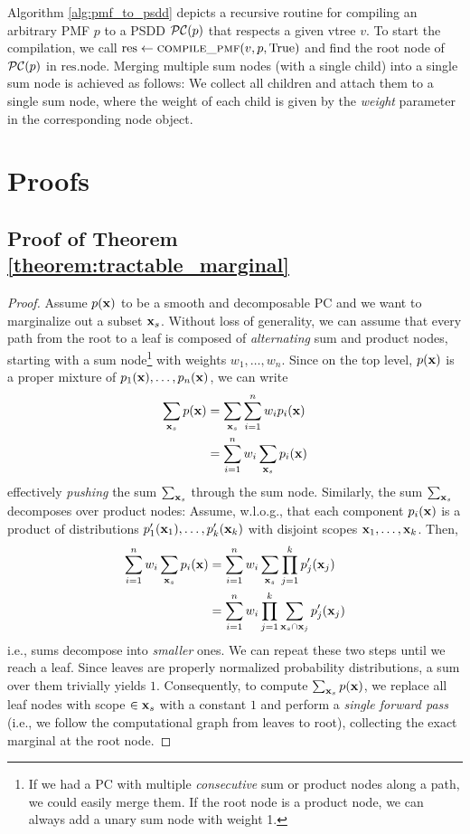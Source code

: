 Algorithm \ref{alg:pmf_to_psdd} depicts a recursive routine for compiling an arbitrary PMF $p$ to a PSDD $\mathcal{PC}(p)$ that respects a given vtree $v$. To start the compilation, we call $\text{res} \gets \textsc{compile\_pmf}(v, p, \text{True})$ and find the root node of $\mathcal{PC}(p)$ in $\text{res.node}$. Merging multiple sum nodes (with a single child) into a single sum node is achieved as follows: We collect all children and attach them to a single sum node, where the weight of each child is given by the \emph{weight} parameter in the corresponding node object.


\chapter{Proofs}
\section{Proof of Theorem \ref{theorem:tractable_marginal}}
\begin{proof}
\label{app:tractable_marginal_proof}
    Assume $p(\mathbf{x})$ to be a smooth and decomposable PC and we want to marginalize out a subset $\mathbf{x}_s$. Without loss of generality, we can assume that every path from the root to a leaf is composed of \textit{alternating} sum and product nodes, starting with a sum node\footnote{If we had a PC with multiple \textit{consecutive} sum or product nodes along a path, we could easily merge them. If the root node is a product node, we can always add a unary sum node with weight 1.} with weights $w_1,\dots,w_n$. Since on the top level, $p(\mathbf{x})$ is a proper mixture of $p_1(\mathbf{x}),\dots,p_n(\mathbf{x})$, we can write
    \begin{align}
        \sum_{\mathbf{x}_s} p(\mathbf{x}) &= \sum_{\mathbf{x}_s} \sum_{i=1}^n w_i p_i(\mathbf{x}) \\
                            &= \sum_{i=1}^n w_i \sum_{\mathbf{x}_s} p_i(\mathbf{x})
    \end{align}
    effectively \textit{pushing} the sum $\sum_{\mathbf{x}_s}$ through the sum node. Similarly, the sum $\sum_{\mathbf{x}_s}$ decomposes over product nodes: Assume, w.l.o.g., that each component $p_i(\mathbf{x})$ is a product of distributions $p'_1(\mathbf{x}_1),\dots,p'_k(\mathbf{x}_k)$ with disjoint scopes $\mathbf{x}_1,\dots,\mathbf{x}_k$. Then,
    \begin{align}
        \sum_{i=1}^n w_i \sum_{\mathbf{x}_s} p_i(\mathbf{x}) &= \sum_{i=1}^n w_i \sum_{\mathbf{x}_s} \prod_{j=1}^k p'_j(\mathbf{x}_j) \\
                                               &= \sum_{i=1}^n w_i \prod_{j=1}^k \sum_{\mathbf{x}_s \cap \mathbf{x}_j} p'_j(\mathbf{x}_j)
    \end{align}
    i.e., sums decompose into \textit{smaller} ones.
    We can repeat these two steps until we reach a leaf. Since leaves are properly normalized probability distributions, a sum over them trivially yields $1$. Consequently, to compute $\sum_{\mathbf{x}_s} p(\mathbf{x})$, we replace all leaf nodes with scope $\in \mathbf{x}_s$ with a constant $1$ and perform a \textit{single forward pass} (i.e., we follow the computational graph from leaves to root), collecting the exact marginal at the root node.
\end{proof}

